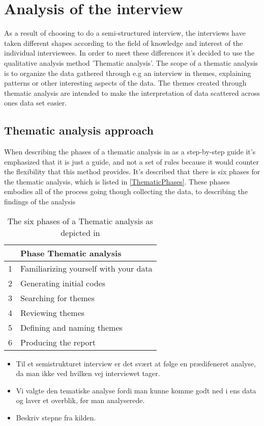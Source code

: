 \section{Analysis of the interview}
\label{InterviewAnalysis}
%
As a result of choosing to do a semi-structured interview, the interviews have taken different shapes according to the field of knowledge and interest of the individual interviewees. In order to meet these differences it's decided to use the qualitative analysis method 'Thematic analysis'. The scope of a thematic analysis is to organize the data gathered through e.g an interview in themes, explaining patterns or other interesting aspects of the data\parencite{PDF:Braun2006}. The themes created through thematic analysis are intended to make the interpretation of data scattered across ones data set easier. 

\subsection{Thematic analysis approach}
\label{ThematicAnalysisApproach}
When describing the phases of a thematic analysis in \parencite[86]{PDF:Braun2006} as a step-by-step guide it's emphasized that it is just a guide, and not a set of rules because it would counter the flexibility that this method provides. It's described that there is six phases for the thematic analysis, which is listed in \autoref{ThematicPhases}. These phases embodies all of the process going though collecting the data, to describing the findings of the analysis

\begin{table}[h]
\begin{tabular}[width=\textwidth]{cl}
\hline
& Phase Thematic analysis \\ \hline
1 & Familiarizing yourself with your data \\
2 & Generating initial codes \\
3 & Searching for themes \\
4 & Reviewing themes \\
5 & Defining and naming themes\\
6 & Producing the report \\ \hline
\end{tabular}
\caption{The six phases of a Thematic analysis as depicted in \parencite[87]{PDF:Braun2006}}
\label{ThematicPhases}
\end{table}



\begin{itemize}
	\item Til et semistrukturet interview er det svært at følge en prædifeneret analyse, da man ikke ved hvilken vej interviewet tager.
	\item Vi valgte den tematiske analyse fordi man kunne komme godt ned i ens data og laver et overblik, før man analyserede.
	\item Beskriv stepne fra kilden.
\end{itemize}

